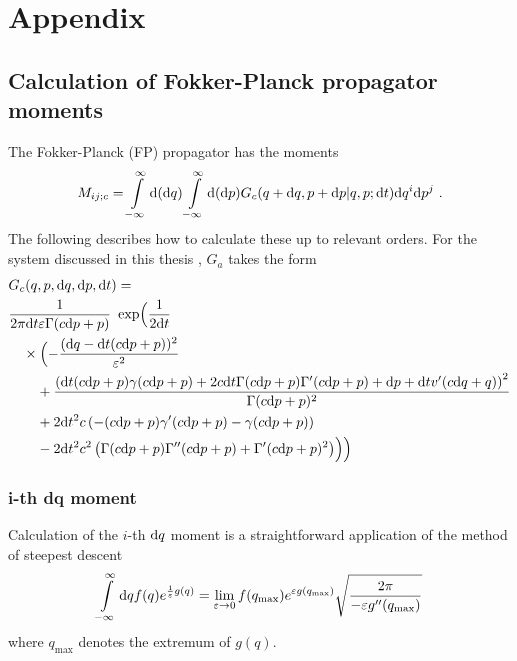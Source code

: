 \chapter{Appendix}

\section{Calculation of Fokker-Planck propagator moments}

The Fokker-Planck (FP) propagator has the moments
\begin{align}
	\label{eqn:fp-moment-integral}
	M_{ij;c} =
		\int\limits_{-\infty}^\infty\mathrm{d} (\mathrm{d} q)
		\int\limits_{-\infty}^\infty\mathrm{d} (\mathrm{d} p)
		G_c(q+\mathrm{d} q,p+\mathrm{d} p|q,p; \mathrm{d} t)\mathrm{d} q^i\mathrm{d} p^j ~.
\end{align}
%
The following describes how to calculate these up to relevant orders. For the system discussed in this thesis  , \(G_a\) takes the form
%
\begin{align}
	\label{eqn:fp-propagator}
	&G_c(q,p,\mathrm{d} q,\mathrm{d} p,\mathrm{d} t) = \\ \notag
	& \frac1{2 \pi  \mathrm{d} t \varepsilon  \Gamma (c \mathrm{d} p +p)}
	  ~\operatorname{exp} \Bigl(\frac1{2 \mathrm{d} t} \\ \notag
	&\quad \times \Bigl(
		-\frac{(\mathrm{d} q-\mathrm{d} t (c \mathrm{d} p +p))^2}{\varepsilon ^2} \\ \notag
		&\qquad +\frac{\left(\mathrm{d} t (c \mathrm{d} p +p) \gamma (c \mathrm{d} p +p)+2 c \mathrm{d} t  \Gamma (c \mathrm{d} p +p) \Gamma '(c \mathrm{d} p +p)+\mathrm{d} p+\mathrm{d} t v'(c \mathrm{d} q+q)\right)^2}{\Gamma (c \mathrm{d} p +p)^2} \\ \notag
		&\qquad +2 \mathrm{d} t^2 c  \left(-(c \mathrm{d} p +p) \gamma '(c \mathrm{d} p +p)-\gamma (c \mathrm{d} p +p)\right) \\ \notag
		&\qquad -2 \mathrm{d} t^2 c ^2 \left(\Gamma (c \mathrm{d} p +p) \Gamma ''(c \mathrm{d} p +p)+\Gamma '(c \mathrm{d} p +p)^2\right)\Bigr)\Bigr)
\end{align}


\subsection{i-th dq moment}

Calculation of the \(i\)-th \(\mathrm{d} q\) moment is a straightforward application of the method of steepest descent 
\begin{align}
	\int\limits_{-\infty}^\infty\mathrm{d} q f(q)e^{\frac1\varepsilon g(q)}
	= \lim_{\varepsilon\to0} f(q_{\text{max}}) e^{\varepsilon g(q_{\text{max}})}\sqrt{\frac{2\pi}{-\varepsilon g''(q_{\text{max}})}}
\end{align}
where \(q_{\text{max}}\) denotes the extremum of \(g(q)\).


